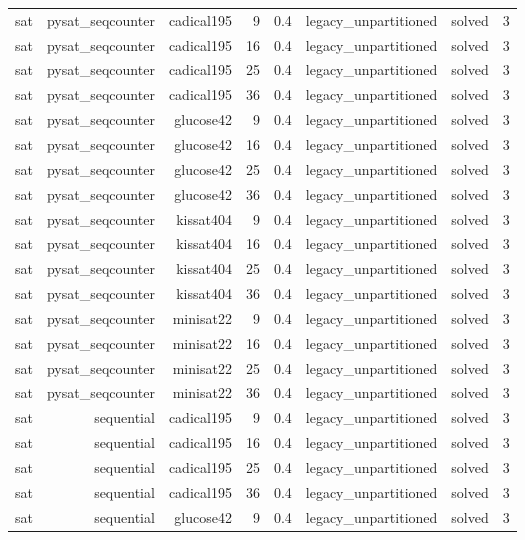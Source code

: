 \begin{tabular}{lrrrrrrr}
sat & pysat\_seqcounter & cadical195 & 9 & 0.4 & legacy\_unpartitioned & solved & 3 \\
sat & pysat\_seqcounter & cadical195 & 16 & 0.4 & legacy\_unpartitioned & solved & 3 \\
sat & pysat\_seqcounter & cadical195 & 25 & 0.4 & legacy\_unpartitioned & solved & 3 \\
sat & pysat\_seqcounter & cadical195 & 36 & 0.4 & legacy\_unpartitioned & solved & 3 \\
sat & pysat\_seqcounter & glucose42 & 9 & 0.4 & legacy\_unpartitioned & solved & 3 \\
sat & pysat\_seqcounter & glucose42 & 16 & 0.4 & legacy\_unpartitioned & solved & 3 \\
sat & pysat\_seqcounter & glucose42 & 25 & 0.4 & legacy\_unpartitioned & solved & 3 \\
sat & pysat\_seqcounter & glucose42 & 36 & 0.4 & legacy\_unpartitioned & solved & 3 \\
sat & pysat\_seqcounter & kissat404 & 9 & 0.4 & legacy\_unpartitioned & solved & 3 \\
sat & pysat\_seqcounter & kissat404 & 16 & 0.4 & legacy\_unpartitioned & solved & 3 \\
sat & pysat\_seqcounter & kissat404 & 25 & 0.4 & legacy\_unpartitioned & solved & 3 \\
sat & pysat\_seqcounter & kissat404 & 36 & 0.4 & legacy\_unpartitioned & solved & 3 \\
sat & pysat\_seqcounter & minisat22 & 9 & 0.4 & legacy\_unpartitioned & solved & 3 \\
sat & pysat\_seqcounter & minisat22 & 16 & 0.4 & legacy\_unpartitioned & solved & 3 \\
sat & pysat\_seqcounter & minisat22 & 25 & 0.4 & legacy\_unpartitioned & solved & 3 \\
sat & pysat\_seqcounter & minisat22 & 36 & 0.4 & legacy\_unpartitioned & solved & 3 \\
sat & sequential & cadical195 & 9 & 0.4 & legacy\_unpartitioned & solved & 3 \\
sat & sequential & cadical195 & 16 & 0.4 & legacy\_unpartitioned & solved & 3 \\
sat & sequential & cadical195 & 25 & 0.4 & legacy\_unpartitioned & solved & 3 \\
sat & sequential & cadical195 & 36 & 0.4 & legacy\_unpartitioned & solved & 3 \\
sat & sequential & glucose42 & 9 & 0.4 & legacy\_unpartitioned & solved & 3 \\

\end{tabular}
